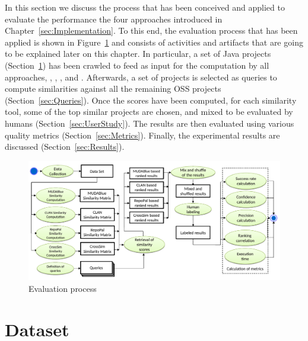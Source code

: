 




In this section we discuss the process that has been conceived and applied to evaluate the performance the four approaches introduced in Chapter~\ref{sec:Implementation}. To this end, the evaluation process that has been applied is shown in Figure~\ref{fig:EvaluationProcess} and consists of activities and artifacts that are going to be explained later on this chapter. In particular, a set of Java projects (Section~\ref{sec:Dataset}) has been crawled to feed as input for the computation by all approaches, \ie \MUDABlue, \CLAN, \RepoPal, and \CrossSim. Afterwards, a set of projects is selected as queries to compute similarities against all the remaining OSS projects (Section~\ref{sec:Queries}). Once the scores have been computed, for each similarity tool, some of the top similar projects are chosen, and mixed to be evaluated by humans (Section~\ref{sec:UserStudy}). The results are then evaluated using various quality metrics (Section~\ref{sec:Metrics}). Finally, the experimental results are discussed (Section~\ref{sec:Results}).


\begin{figure}[h!]
	\centering
	\includegraphics[width=0.99\linewidth]{images/EvaluationProcess}
	\caption{Evaluation process}
	\label{fig:EvaluationProcess}
\end{figure}








\section{Dataset} \label{sec:Dataset}

